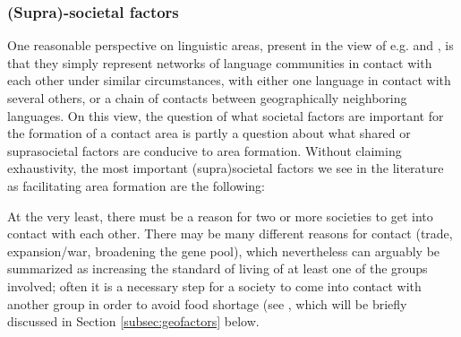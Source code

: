 \documentclass[output=paper,
modfonts
]{langscibook}
\begin{document}
\subsubsection{(Supra)-societal factors} \label{subsec:societal}

One reasonable perspective on linguistic areas, present in the view of e.g. \cite{Campbell2006Linguistic} and \cite{Matras2011Explaining},  is that they simply represent networks of language communities in contact with each other under similar circumstances, with either one language in contact with several others, or a chain of contacts between geographically neighboring languages. On this view, the question of what societal factors are important for the formation of a contact area is partly a question about what shared or suprasocietal factors are conducive to area formation. Without claiming exhaustivity, the most important (supra)societal factors we see in the literature as facilitating area formation are the following:


At the very least, there must be a reason for two or more societies to get into contact with each other. There may be many different reasons for contact (trade, expansion/war, broadening the gene pool), which nevertheless can arguably be summarized as increasing the standard of living of at least one of the groups involved; often it is a necessary step for a society to come into contact with another group in order to avoid food shortage (see \citealt{nettle1999linguistic}, which will be briefly discussed in Section \ref{subsec:geofactors} below.

\end{document}
